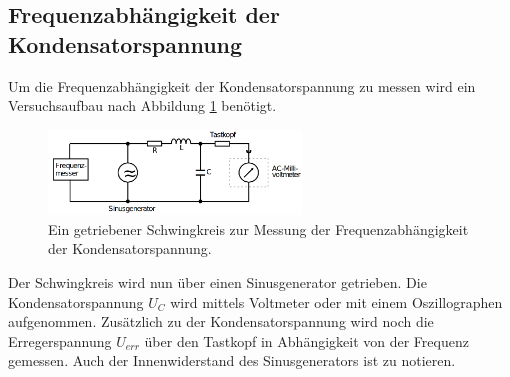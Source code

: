 \subsection{Frequenzabhängigkeit der Kondensatorspannung}
\label{sec:c}
Um die Frequenzabhängigkeit der Kondensatorspannung zu messen wird ein Versuchsaufbau nach Abbildung \ref{fig:c} benötigt.
\begin{figure}[H]
    \centering
    \includegraphics[width=0.6\textwidth]{pictures/Aufbau_b.png}
    \caption{Ein getriebener Schwingkreis zur Messung der Frequenzabhängigkeit der Kondensatorspannung.\cite{AP01}}
    \label{fig:c}
\end{figure}
\noindent
Der Schwingkreis wird nun über einen Sinusgenerator getrieben. Die Kondensatorspannung $U_C$ wird mittels Voltmeter oder mit einem Oszillographen
aufgenommen. Zusätzlich zu der Kondensatorspannung wird noch die Erregerspannung $U_{err}$ über den Tastkopf in Abhängigkeit von der Frequenz
gemessen. Auch der Innenwiderstand des Sinusgenerators ist zu notieren.

